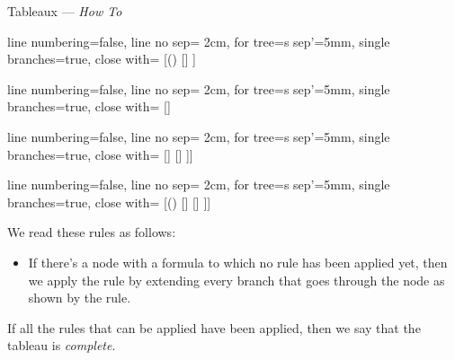 \documentclass[../slides.tex]{subfiles}
\begin{document}
\begin{frame}{Tableaux --- \emph{How To}}
\begin{enumerate}
\begin{center}
{					\begin{prooftree}
					{
					line numbering=false,
					line no sep= 2cm,
					for tree={s sep'=5mm},
					single branches=true,
					close with=\xmark
					}
					[\neg (\phi\to\psi) [\phi [\neg \psi ] ] ]
					\end{prooftree}
					\begin{prooftree}
					{
					line numbering=false,
					line no sep= 2cm,
					for tree={s sep'=5mm},
					single branches=true,
					close with=\xmark
					}
					[\phi\to\psi [\neg \phi ] [\psi ] ]
					\end{prooftree}
					\begin{prooftree}
					{
					line numbering=false,
					line no sep= 2cm,
					for tree={s sep'=5mm},
					single branches=true,
					close with=\xmark
					}
					[\phi\leftrightarrow \psi [\phi [\psi] ] [\neg \phi [\neg \psi] ] ]]
					\end{prooftree}
					\begin{prooftree}
					{
					line numbering=false,
					line no sep= 2cm,
					for tree={s sep'=5mm},
					single branches=true,
					close with=\xmark
					}
					[\neg(\phi\leftrightarrow \psi) [\phi [\neg \psi] ] [\neg \phi [ \psi] ] ]]
					\end{prooftree}}

				\end{center}
			We read these rules as follows:
			
				\begin{itemize}
		
			\item If there's a node with a formula to which no rule has been applied yet, then we apply the rule by extending every branch that goes through the node as shown by the rule.
			
			\end{itemize}
			
			 If all the rules that can be applied have been applied, then we say that the tableau is \emph{complete}.
	
	\end{enumerate}

\end{frame}
\end{document}
